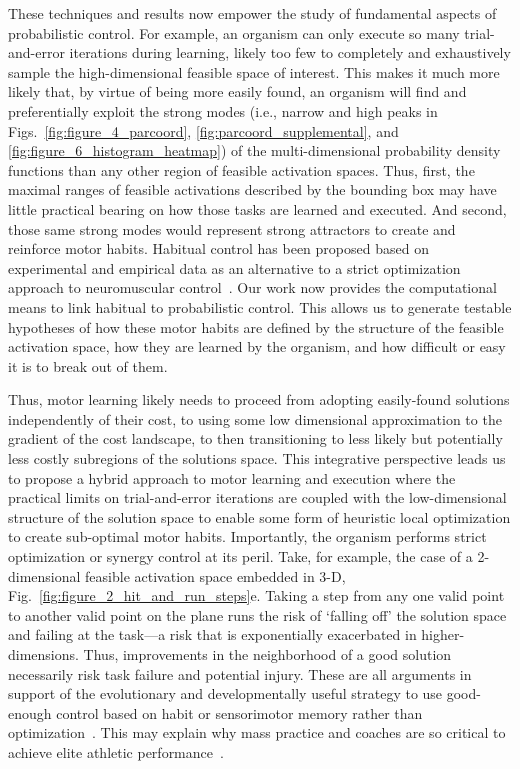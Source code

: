 \documentclass[9pt,twocolumn,twoside,lineno]{pnas-new}
\begin{document}
These techniques and results now empower the study of fundamental aspects of probabilistic control. For example, an organism can only execute so many trial-and-error iterations during learning, likely too few to completely and exhaustively sample the high-dimensional feasible space of interest. This makes it much more likely that, by virtue of being more easily found, an organism will find and preferentially exploit the strong modes (i.e., narrow and high peaks in Figs.~\ref{fig:figure_4_parcoord}, \ref{fig:parcoord_supplemental}, and \ref{fig:figure_6_histogram_heatmap}) of the multi-dimensional probability density functions than any other region of feasible activation spaces. Thus, first, the maximal ranges of feasible activations described by the bounding box \cite{sohn2013cat_bounding_box,Valero-Cuevas2015high-dimensional} may have little practical bearing on how those tasks are learned and executed. And second, those same strong modes would represent strong attractors to create and reinforce motor habits. Habitual control has been proposed based on experimental and empirical data as an alternative to a strict optimization approach to neuromuscular control~\cite{deRugy2012habitual}. Our work now provides the computational means to link habitual to probabilistic control. This allows us to generate testable hypotheses of how these motor habits are defined by the structure of the feasible activation space, how they are learned by the organism, and how difficult or easy it is to break out of them.

Thus, motor learning likely needs to proceed from adopting easily-found solutions independently of their cost, to using some low dimensional approximation to the gradient of the cost landscape, to then transitioning to less likely but potentially less costly subregions of the solutions space. This integrative perspective leads us to propose a hybrid approach to motor learning and execution where the practical limits on trial-and-error iterations are coupled with the low-dimensional structure of the solution space to enable some form of heuristic local optimization to create sub-optimal motor habits. Importantly, the organism performs strict optimization or synergy control at its peril. Take, for example, the case of a 2-dimensional feasible activation space embedded in 3-D, Fig.~\ref{fig:figure_2_hit_and_run_steps}e. Taking a step from any one valid point to another valid point on the plane runs the risk of `falling off' the solution space and failing at the task---a risk that is exponentially exacerbated in higher-dimensions. Thus, improvements in the neighborhood of a good solution necessarily risk task failure and potential injury. These are all arguments in support of the evolutionary and developmentally useful strategy to use good-enough control based on habit or sensorimotor memory rather than optimization~\cite{deRugy2012habitual, santello2012context}. This may explain why mass practice and coaches are so critical to achieve elite athletic performance~\cite{gladwell2008outliers}.
\end{document}
